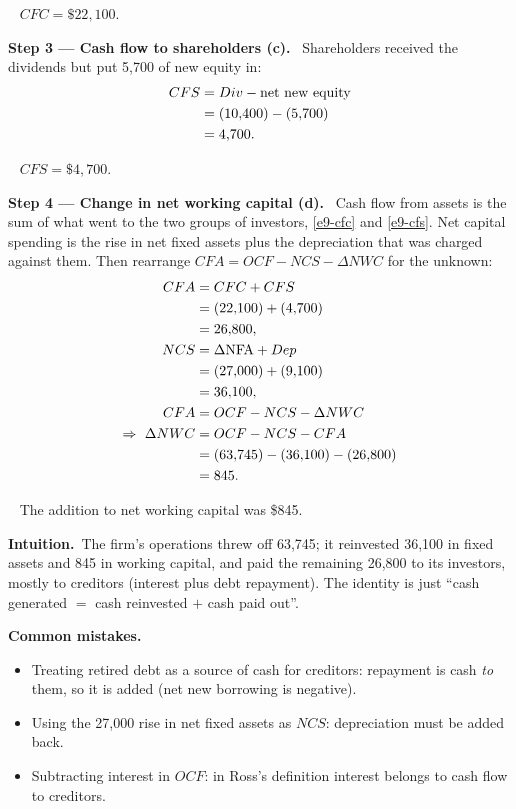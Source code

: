 \documentclass[11pt,a4paper]{article}
\newcommand{\step}[2]{\par\medskip\noindent\textbf{Step #1 --- #2.}~}
\newcommand{\intuition}{\par\medskip\noindent\textbf{Intuition.}~}
\newcommand{\answer}[1]{\par\smallskip\noindent\fbox{\textbf{Answer #1.}}~}
\newcommand{\pitfalls}{\par\medskip\noindent\textbf{Common mistakes.}}
\begin{document}
\answer{(b)} $CFC = \$22{,}100$.

\step{3}{Cash flow to shareholders (c)}
Shareholders received the dividends but put 5,700 of new equity in:
\begin{align}
  CFS &= Div - \text{net new equity} \notag\\
  &= (10{,}400) - (5{,}700) \notag\\
  &= 4{,}700. \label{e9-cfs}
\end{align}

\answer{(c)} $CFS = \$4{,}700$.

\step{4}{Change in net working capital (d)}
Cash flow from assets is the sum of what went to the two groups of investors,
\eqref{e9-cfc} and \eqref{e9-cfs}. Net capital spending is the rise in net fixed assets plus the
depreciation that was charged against them. Then rearrange $CFA = OCF - NCS - \Delta NWC$ for the
unknown:
\begin{align}
  CFA &= CFC + CFS \notag\\
  &= (22{,}100) + (4{,}700) \notag\\
  &= 26{,}800, \label{e9-cfa}\\
  NCS &= \Delta\text{NFA} + Dep \notag\\
  &= (27{,}000) + (9{,}100) \notag\\
  &= 36{,}100, \label{e9-ncs}\\
  CFA &= OCF - NCS - \Delta NWC \notag\\
  \Rightarrow\ \Delta NWC &= OCF - NCS - CFA \notag\\
  &= (63{,}745) - (36{,}100) - (26{,}800) \notag\\
  &= 845. \notag
\end{align}

\answer{(d)} The addition to net working capital was \$845.

\intuition The firm's operations threw off 63,745; it reinvested 36,100 in fixed assets and 845 in
working capital, and paid the remaining 26,800 to its investors, mostly to creditors (interest plus
debt repayment). The identity is just ``cash generated $=$ cash reinvested $+$ cash paid out''.

\pitfalls
\begin{itemize}
  \item Treating retired debt as a source of cash for creditors: repayment is cash \emph{to} them, so it is added (net new borrowing is negative).
  \item Using the 27,000 rise in net fixed assets as $NCS$: depreciation must be added back.
  \item Subtracting interest in $OCF$: in Ross's definition interest belongs to cash flow to creditors.
\end{itemize}
\end{document}
